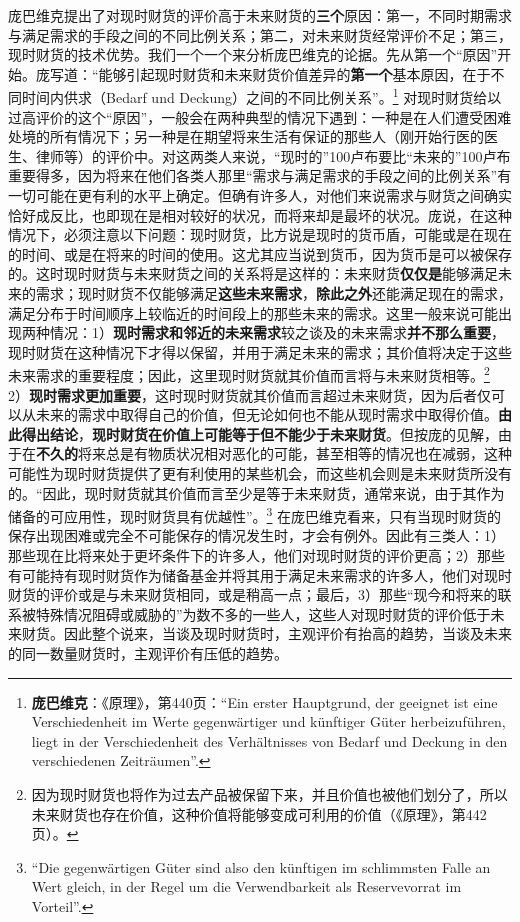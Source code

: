 \documentclass[fontset=fandol, a4paper, 12pt, openright]{ctexbook}
\begin{document}
庞巴维克提出了对现时财货的评价高于未来财货的\textbf{三个}原因：第一，不同时期需求与满足需求的手段之间的不同比例关系；第二，对未来财货经常评价不足；第三，现时财货的技术优势。我们一个一个来分析庞巴维克的论据。先从第一个“原因”开始。庞写道：“能够引起现时财货和未来财货价值差异的\textbf{第一个}基本原因，在于不同时间内供求（Bedarf und Deckung）之间的不同比例关系”。\footnote{\textbf{庞巴维克}：《原理》，第440页：“Ein erster Hauptgrund, der geeignet ist eine Verschiedenheit im Werte gegenw\"{a}rtiger und k\"{u}nftiger G\"{u}ter herbeizuf\"{u}hren, liegt in der Verschiedenheit des Verh\"{a}ltnisses von Bedarf und Deckung in den verschiedenen Zeitr\"{a}umen”.} 对现时财货给以过高评价的这个“原因”，一般会在两种典型的情况下遇到：一种是在人们遭受困难处境的所有情况下；另一种是在期望将来生活有保证的那些人（刚开始行医的医生、律师等）的评价中。对这两类人来说，“现时的”100卢布要比“未来的”100卢布重要得多，因为将来在他们各类人那里“需求与满足需求的手段之间的比例关系”有一切可能在更有利的水平上确定。但确有许多人，对他们来说需求与财货之间确实恰好成反比，也即现在是相对较好的状况，而将来却是最坏的状况。庞说，在这种情况下，必须注意以下问题：现时财货，比方说是现时的货币盾，可能或是在现在的时间、或是在将来的时间的使用。这尤其应当说到货币，因为货币是可以被保存的。这时现时财货与未来财货之间的关系将是这样的：未来财货\textbf{仅仅是}能够满足未来的需求；现时财货不仅能够满足\textbf{这些未来需求}，\textbf{除此之外}还能满足现在的需求，满足分布于时间顺序上较临近的时间段上的那些未来的需求。这里一般来说可能出现两种情况：1）\textbf{现时需求和邻近的未来需求}较之谈及的未来需求\textbf{并不那么重要}，现时财货在这种情况下才得以保留，并用于满足未来的需求；其价值将决定于这些未来需求的重要程度；因此，这里现时财货就其价值而言将与未来财货相等。\footnote{因为现时财货也将作为过去产品被保留下来，并且价值也被他们划分了，所以未来财货也存在价值，这种价值将能够变成可利用的价值（《原理》，第442页）。} 2）\textbf{现时需求更加重要}，这时现时财货就其价值而言超过未来财货，因为后者仅可以从未来的需求中取得自己的价值，但无论如何也不能从现时需求中取得价值。\textbf{由此得出结论}，\textbf{现时财货在价值上可能等于但不能少于未来财货}。但按庞的见解，由于在\textbf{不久的}将来总是有物质状况相对恶化的可能，甚至相等的情况也在减弱，这种可能性为现时财货提供了更有利使用的某些机会，而这些机会则是未来财货所没有的。“因此，现时财货就其价值而言至少是等于未来财货，通常来说，由于其作为储备的可应用性，现时财货具有优越性”。\footnote{``Die gegenw\"{a}rtigen G\"{u}ter sind also den k\"{u}nftigen im schlimmsten Falle an Wert gleich, in der Regel um die Verwendbarkeit als Reservevorrat im Vorteil''.} 在庞巴维克看来，只有当现时财货的保存出现困难或完全不可能保存的情况发生时，才会有例外。因此有三类人：1）那些现在比将来处于更坏条件下的许多人，他们对现时财货的评价更高；2）那些有可能持有现时财货作为储备基金并将其用于满足未来需求的许多人，他们对现时财货的评价或是与未来财货相同，或是稍高一点；最后，3）那些“现今和将来的联系被特殊情况阻碍或威胁的”为数不多的一些人，这些人对现时财货的评价低于未来财货。因此整个说来，当谈及现时财货时，主观评价有抬高的趋势，当谈及未来的同一数量财货时，主观评价有压低的趋势。
\end{document}
